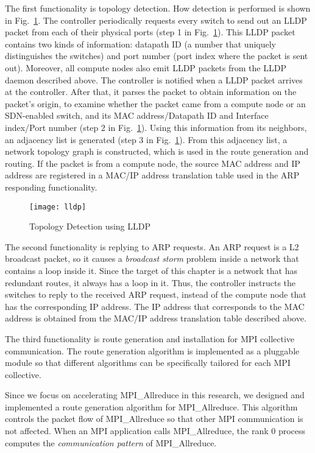 The first functionality is topology detection. How detection is
performed is shown in Fig.~\ref{fig:lldp}. The controller periodically
requests every switch to send out an LLDP packet from each of their physical
ports (step 1 in Fig.~\ref{fig:lldp}). This LLDP packet contains two kinds of
information: datapath ID (a number that uniquely distinguishes the switches)
and port number (port index where the packet is sent out). Moreover, all
compute nodes also emit LLDP packets from the LLDP daemon described above.
The controller is notified when a LLDP packet arrives at the controller. After
that, it parses the packet to obtain information on the packet's origin, to
examine whether the packet came from a compute node or an SDN-enabled
switch, and its MAC address/Datapath ID and Interface index/Port number (step
2 in Fig.~\ref{fig:lldp}). Using this information from its neighbors, an
adjacency list is generated (step 3 in Fig.~\ref{fig:lldp}). From this
adjacency list, a network topology graph is constructed, which is used in the
route generation and routing. If the packet is from a compute node, the
source MAC address and IP address are registered in a MAC/IP address
translation table used in the ARP responding functionality.

\begin{figure}
    \centering
    \texttt{[image: lldp]}
    \caption{Topology Detection using LLDP}%
    \label{fig:lldp}
\end{figure}

The second functionality is replying to ARP requests. An ARP request is
a L2 broadcast packet, so it causes a \emph{broadcast storm} problem
inside a network that contains a loop inside it. Since the target of
this chapter is a network that has redundant routes, it always has a loop
in it. Thus, the controller instructs the switches to reply to the
received ARP request, instead of the compute node that has the
corresponding IP address. The IP address that corresponds to the MAC
address is obtained from the MAC/IP address translation table described above.

The third functionality is route generation and installation for MPI
collective communication. The route generation algorithm is implemented as a
pluggable module so that different algorithms can be specifically tailored for
each MPI collective.

Since we focus on accelerating MPI\_Allreduce in this research, we designed
and implemented a route generation algorithm for MPI\_Allreduce. This
algorithm controls the packet flow of MPI\_Allreduce so that other MPI
communication is not affected. When an MPI application calls MPI\_Allreduce,
the rank 0 process computes the \emph{communication pattern} of
MPI\_Allreduce.

